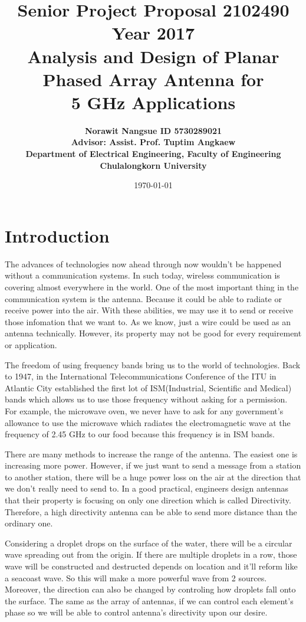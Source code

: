 \documentclass[11pt,a4paper,hidelinks]{article}
\title{
  \textbf{Senior Project Proposal 2102490 Year 2017}  \\[2ex]
  Analysis and Design of Planar Phased Array Antenna for \\[1ex]
  5 GHz Applications
}
\author{\textbf{Norawit Nangsue ID 5730289021} \\[1ex]
\textbf{Advisor: Assist. Prof. Tuptim Angkaew} \\[1ex]
\textbf{Department of Electrical Engineering, Faculty of Engineering} \\[1ex]
\textbf{Chulalongkorn University}
}
\date{\today}
\begin{document}
  \maketitle
  \tableofcontents
  \newpage
  \section{Introduction}
    \indent The advances of technologies now ahead through now wouldn't be happened without a communication systems.
            In such today, wireless communication is covering almost everywhere in the world. One of the most important
            thing in the communication system is the antenna. Because it could be able to radiate or receive power into the air.
            With these abilities, we may use it to send or receive those infomation that we want to. As we know, just a wire
            could be used as an antenna technically. However, its property may not be good for every requirement or application.

    \indent The freedom of using frequency bands bring us to the world of technologies. Back to 1947, in the International Telecommunications
            Conference of the ITU in Atlantic City established the first lot of ISM(Industrial, Scientific and Medical) bands which allows us
            to use those frequency without asking for a permission. For example, the microwave oven, we never have to ask for any government's 
            allowance to use the microwave which radiates the electromagnetic wave at the frequency of 2.45 GHz to our food because this 
            frequency is in ISM bands.

    \indent There are many methods to increase the range of the antenna. The easiest one is increasing more power. However, if we just want
            to send a message from a station to another station, there will be a huge power loss on the air at the direction that we don't
            really need to send to. In a good practical, engineers design antennas that their property is focusing on only one direction which
            is called Directivity. Therefore, a high directivity antenna can be able to send more distance than the ordinary one.

    \indent Considering a droplet drops on the surface of the water, there will be a circular wave spreading out from the origin.
            If there are multiple droplets in a row, those wave will be constructed and destructed depends on location and it'll
            reform like a seacoast wave. So this will make a more powerful wave from 2 sources. Moreover, the direction can also
            be changed by controling how droplets fall onto the surface. The same as the array of antennas, if we can control each
            element's phase so we will be able to control antenna's directivity upon our desire. 
\end{document}
